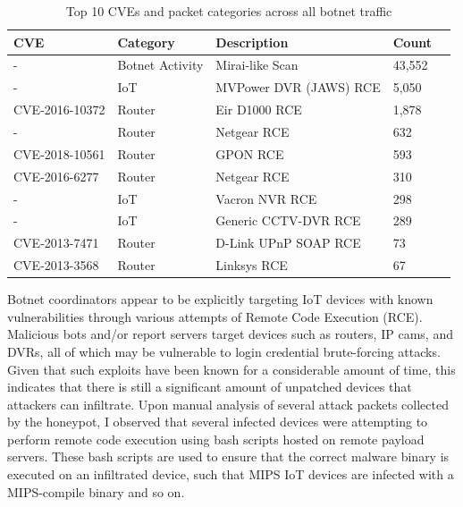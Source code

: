 \begin{table}[!htb]
    \caption{Top 10 CVEs and packet categories across all botnet traffic}
    \centering
    \label{tab:cve_categories}
    \begin{tabular}{|l|l|l|l|l|}
    \hline
    \textbf{CVE} & \textbf{Category} & \textbf{Description} & \textbf{Count} \\ \hline
    -               & Botnet Activity & Mirai-like Scan & 43,552 \\ \hline
    -               & IoT             & MVPower DVR (JAWS) RCE & 5,050 \\ \hline
    CVE-2016-10372  & Router          & Eir D1000 RCE & 1,878 \\ \hline
    -               & Router          & Netgear RCE & 632 \\ \hline
    CVE-2018-10561  & Router          & GPON RCE & 593 \\ \hline
    CVE-2016-6277   & Router          & Netgear RCE & 310 \\ \hline
    -               & IoT             & Vacron NVR RCE & 298 \\ \hline
    -               & IoT             & Generic CCTV-DVR RCE & 289 \\ \hline
    CVE-2013-7471   & Router          & D-Link UPnP SOAP RCE & 73 \\ \hline
    CVE-2013-3568   & Router          & Linksys RCE & 67 \\ \hline
    \end{tabular}
\end{table}

Botnet coordinators appear to be explicitly targeting IoT devices with known vulnerabilities through various attempts of Remote Code Execution (RCE). Malicious bots and/or report servers target devices such as routers, IP cams, and DVRs, all of which may be vulnerable to login credential brute-forcing attacks. Given that such exploits have been known for a considerable amount of time, this indicates that there is still a significant amount of unpatched devices that attackers can infiltrate. Upon manual analysis of several attack packets collected by the honeypot, I observed that several infected devices were attempting to perform remote code execution using bash scripts hosted on remote payload servers. These bash scripts are used to ensure that the correct malware binary is executed on an infiltrated device, such that MIPS IoT devices are infected with a MIPS-compile binary and so on.



